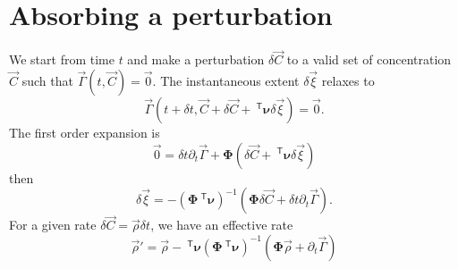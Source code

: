 \documentclass[aps]{revtex4}
\newcommand{\mymat}[1]{\bm{#1}}
\newcommand{\mytrn}[1]{~^{\mathsf{T}}{#1}}
\begin{document}
\section{Absorbing a perturbation}
We start from time $t$ and make a perturbation $\delta\vec{C}$ to a valid set of concentration $\vec{C}$ such that 
$\vec{\Gamma}(t,\vec{C})=\vec{0}$.
The instantaneous extent $\delta\vec{\xi}$ relaxes to 
$$
\vec{\Gamma}(t+\delta t,\vec{C}+\delta\vec{C}+\mytrn{\mymat{\nu}}\delta\vec{\xi}) = \vec{0}.
$$
The first order expansion
is
$$
	\vec{0} = \delta t \partial_t \vec{\Gamma} + \mymat{\Phi}\left( \delta\vec{C} + \mytrn{\mymat{\nu}}\delta\vec{\xi} \right)
$$
then
$$
	\delta\vec{\xi} = -\left(\mymat{\Phi}\mytrn{\mymat{\nu}}\right)^{-1}\left(\mymat{\Phi}\delta\vec{C}+\delta t \partial_t\vec{\Gamma}\right).
$$
For a given rate $\delta\vec{C} = \vec{\rho} \delta t$, we have an effective rate
$$
	\vec{\rho}' = \vec{\rho} -  \mytrn{\mymat{\nu}}\left(\mymat{\Phi}\mytrn{\mymat{\nu}}\right)^{-1}\left(\mymat{\Phi}\vec{\rho}+\partial_t\vec{\Gamma}\right)
$$
\end{document}
